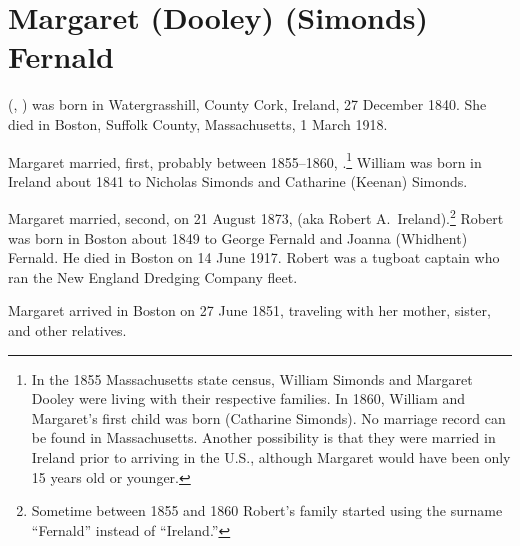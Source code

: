 \section{Margaret (Dooley) (Simonds) Fernald}\label{per:Margaret3Dooley}

 (, ) was born in Watergrasshill, County Cork, Ireland, 27 December 1840.\cite{Margaret3DooleyBaptism:2} She died in Boston, Suffolk County, Massachusetts, 1 March 1918.\cite{Margaret3DooleyDeath} 

Margaret married, first, probably between 1855--1860, .\footnote{In the 1855 Massachusetts state census, William Simonds and Margaret Dooley were living with their respective families. In 1860, William and Margaret's first child was born (Catharine Simonds). No marriage record can be found in Massachusetts. Another possibility is that they were married in Ireland prior to arriving in the U.S., although Margaret would have been only 15 years old or younger.} William was born in Ireland about 1841\cite{Census1855WilliamSimonds} to Nicholas Simonds and Catharine (Keenan) Simonds.\cite{WilliamSimondsDeath}

Margaret married, second, on 21 August 1873, \cite{RobertFernaldMarriage:2} (aka Robert A.\ Ireland\cite{Census1855RobertFernald:1}).\footnote{Sometime between 1855 and 1860 Robert's family started using the surname ``Fernald'' instead of ``Ireland.''} Robert was born in Boston about 1849 to George Fernald and Joanna (Whidhent) Fernald.\cite{RobertFernaldMarriage:3} He died in Boston on 14 June 1917.\cite{RobertFernaldDeath:1} Robert was a tugboat captain who ran the New England Dredging Company fleet.\cite{RobertFernaldDeath:2}

Margaret arrived in Boston on 27 June 1851, traveling with her mother, sister, and other relatives.\cite{Chascay:9}

